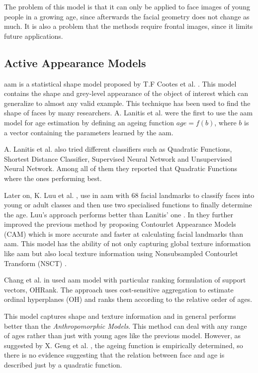 The problem of this model is that it can only be applied to face images of young people in a growing age, since afterwards the facial geometry does not change as much. It is also a problem that the methods require frontal images, since it limits future applications.

\subsection{Active Appearance Models}\label{subsec:AAM}

\gls{aam} is a statistical shape model proposed by T.F Cootes et al. \cite{Cootes:2001:AAM:378040.378090}. This model contains the shape and grey-level appearance of the object of interest which can generalize to almost any valid example. This technique has been used to find the shape of faces by many researchers. A. Lanitis et al. \cite{791208} \cite{993553} \cite{Lanitis:2004:CDC:2225304.2226166} were the first to use the \gls{aam} model for age estimation by defining an ageing function $age=f(b)$, where $b$ is a vector containing the parameters learned by the \gls{aam}.

A. Lanitis et al. \cite{Lanitis:2004:CDC:2225304.2226166} also tried different classifiers such as Quadratic Functions, Shortest Distance Classifier, Supervised Neural Network and Unsupervised Neural Network. Among all of them they reported that Quadratic Functions where the ones performing best.

Later on, K. Luu et al. \cite{Luu:2009:AEU:1736406.1736456, LuuSSBS11}, use in \cite{Luu:2009:AEU:1736406.1736456} \gls{aam} with 68 facial landmarks to classify faces into young or adult classes and then use two specialised functions to finally determine the age. Luu's approach performs better than Lanitis' one \cite{Lanitis:2004:CDC:2225304.2226166}. In \cite{LuuSSBS11} they further improved the previous method by proposing Contourlet Appearance Models (CAM) which is more accurate and faster at calculating facial landmarks than \gls{aam}. This model has the ability of not only capturing global texture information like \gls{aam} but also local texture information using Nonsubsampled Contourlet Transform (NSCT) \cite{1703596}.

Chang et al. in \cite{5995437} used \gls{aam} model with particular ranking formulation of support vectors, OHRank. The approach uses cost-sensitive aggregation to estimate ordinal hyperplanes (OH) and ranks them according to the relative order of ages.

This model captures shape and texture information and in general performs better than the \textit{Anthropomorphic Models}. This method can deal with any range of ages rather than just with young ages like the previous model. However, as suggested by X. Geng et al. \cite{Geng:2006:LFA:1180639.1180711}, the ageing function is empirically determined, so there is no evidence suggesting that the relation between face and age is described just by a quadratic function.

